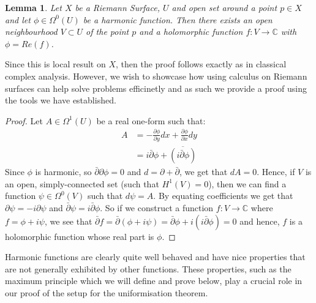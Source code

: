 \documentclass[a4paper,12pt]{report}
\theoremstyle{plain}
\newtheorem{lemma}[thm]{Lemma}
\theoremstyle{definition}
\begin{document}
\begin{lemma}\label{HarmRealHol}
  Let $X$ be a Riemann Surface, $U$ and open set around a point $p \in X$ and let $\phi \in \Omega^0(U)$ be a harmonic function. Then there exists an open neighbourhood $V \subset U$ of the point $p$ and a holomorphic function $f \colon V \rightarrow \mathbb{C}$ with $\phi = Re(f)$.
\end{lemma}
Since this is local result on $X$, then the proof follows exactly as in classical complex analysis. However, we wish to showcase how using calculus on Riemann surfaces can help solve problems efficinetly and as such we provide a proof using the tools we have established.
\begin{proof}
  Let $A \in \Omega^1(U)$ be a real one-form such that: 
  \begin{align*}
    A &= -\frac{\partial \phi}{\partial y} dx + \frac{\partial \phi}{\partial x} dy \\ &= i\bar{\partial}\phi + \overline{(i\bar{\partial}\phi)}
  \end{align*}
  Since $\phi$ is harmonic, so $\bar{\partial}\partial \phi = 0$ and $d = \partial + \bar{\partial}$, we get that $dA = 0$. Hence, if $V$ is an open, simply-connected set (such that $H^1(V)=0$), then we can find a function $\psi \in \Omega^0(V)$ such that $d\psi = A$. By equating coefficients we get that $\partial \psi = -i \partial \psi$ and $\bar{\partial} \psi = i \bar{\partial} \phi$. So if we construct a function $f \colon V \rightarrow \mathbb{C}$ where $f = \phi + i \psi$, we see that $\bar{\partial}f = \bar{\partial}(\phi + i\psi) = \bar{\partial}\phi +i(i\bar{\partial}\phi) = 0$ and hence, $f$ is a holomorphic function whose real part is $\phi$. 
\end{proof}

Harmonic functions are clearly quite well behaved and have nice properties that are not generally exhibited by other functions. These properties, such as the maximum principle which we will define and prove below, play a crucial role in our proof of the setup for the uniformisation theorem.
\end{document}
